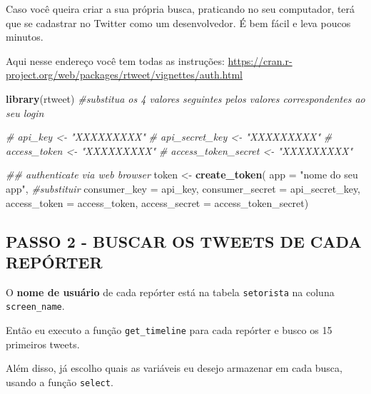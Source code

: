 \documentclass[
]{book}
\newenvironment{Shaded}{\begin{snugshade}}{\end{snugshade}}
\newcommand{\CommentTok}[1]{\textcolor[rgb]{0.56,0.35,0.01}{\textit{#1}}}
\newcommand{\ControlFlowTok}[1]{\textcolor[rgb]{0.13,0.29,0.53}{\textbf{#1}}}
\newcommand{\DataTypeTok}[1]{\textcolor[rgb]{0.13,0.29,0.53}{#1}}
\newcommand{\DecValTok}[1]{\textcolor[rgb]{0.00,0.00,0.81}{#1}}
\newcommand{\KeywordTok}[1]{\textcolor[rgb]{0.13,0.29,0.53}{\textbf{#1}}}
\newcommand{\NormalTok}[1]{#1}
\newcommand{\OperatorTok}[1]{\textcolor[rgb]{0.81,0.36,0.00}{\textbf{#1}}}
\newcommand{\StringTok}[1]{\textcolor[rgb]{0.31,0.60,0.02}{#1}}
\begin{document}
Caso você queira criar a sua própria busca, praticando no seu
computador, terá que se cadastrar no Twitter como um desenvolvedor. É
bem fácil e leva poucos minutos.

Aqui nesse endereço você tem todas as instruções:
\url{https://cran.r-project.org/web/packages/rtweet/vignettes/auth.html}

\begin{Shaded}
\begin{Highlighting}[]
\KeywordTok{library}\NormalTok{(rtweet)}
\CommentTok{#substitua os 4 valores seguintes pelos valores correspondentes ao seu login}

\CommentTok{# api_key <- "XXXXXXXXX"}
\CommentTok{# api_secret_key <- "XXXXXXXXX"}
\CommentTok{# access_token <- "XXXXXXXXX"}
\CommentTok{# access_token_secret <- "XXXXXXXXX"}

\CommentTok{## authenticate via web browser}
\NormalTok{token <-}\StringTok{ }\KeywordTok{create_token}\NormalTok{(}
  \DataTypeTok{app =} \StringTok{"nome do seu app"}\NormalTok{, }\CommentTok{#substituir}
  \DataTypeTok{consumer_key =}\NormalTok{ api_key,}
  \DataTypeTok{consumer_secret =}\NormalTok{ api_secret_key,}
  \DataTypeTok{access_token =}\NormalTok{ access_token,}
  \DataTypeTok{access_secret =}\NormalTok{ access_token_secret)}
\end{Highlighting}
\end{Shaded}

\hypertarget{passo-2---buscar-os-tweets-de-cada-repuxf3rter}{%
\subsection{PASSO 2 - BUSCAR OS TWEETS DE CADA
REPÓRTER}\label{passo-2---buscar-os-tweets-de-cada-repuxf3rter}}

O \textbf{nome de usuário} de cada repórter está na tabela
\texttt{setorista} na coluna \texttt{screen\_name}.

Então eu executo a função \texttt{get\_timeline} para cada repórter e
busco os 15 primeiros tweets.

Além disso, já escolho quais as variáveis eu desejo armazenar em cada
busca, usando a função \texttt{select}.

\begin{Shaded}
\end{Shaded}
\end{document}
